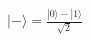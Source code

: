 \documentclass[preview]{standalone}
\begin{document}
\begin{align*}
|-\rangle = \frac{|0\rangle - |1\rangle}{\sqrt{2}}
\end{align*}
\end{document}
